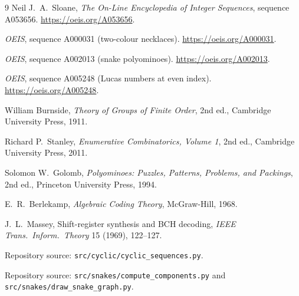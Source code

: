 \documentclass[11pt,a4paper]{article}
\theoremstyle{definition}
\theoremstyle{plain}
\begin{document}
\begin{thebibliography}{9}
Neil J.~A.~Sloane, \emph{The On-Line Encyclopedia of Integer Sequences}, sequence A053656.
\url{https://oeis.org/A053656}.

\emph{OEIS}, sequence A000031 (two-colour necklaces).
\url{https://oeis.org/A000031}.

\emph{OEIS}, sequence A002013 (snake polyominoes).
\url{https://oeis.org/A002013}.

\emph{OEIS}, sequence A005248 (Lucas numbers at even index).
\url{https://oeis.org/A005248}.

William Burnside, \emph{Theory of Groups of Finite Order}, 2nd ed., Cambridge
University Press, 1911.

Richard P.~Stanley, \emph{Enumerative Combinatorics, Volume 1}, 2nd ed.,
Cambridge University Press, 2011.

Solomon W.~Golomb, \emph{Polyominoes: Puzzles, Patterns, Problems, and
Packings}, 2nd ed., Princeton University Press, 1994.

E.~R.~Berlekamp, \emph{Algebraic Coding Theory}, McGraw-Hill, 1968.

J.~L.~Massey,
\newblock Shift-register synthesis and BCH decoding,
\newblock \emph{IEEE Trans.\ Inform.\ Theory} 15 (1969), 122--127.

Repository source: \texttt{src/cyclic/cyclic\_sequences.py}.

Repository source: \texttt{src/snakes/compute\_components.py} and
\texttt{src/snakes/draw\_snake\_graph.py}.
\end{thebibliography}
\end{document}
